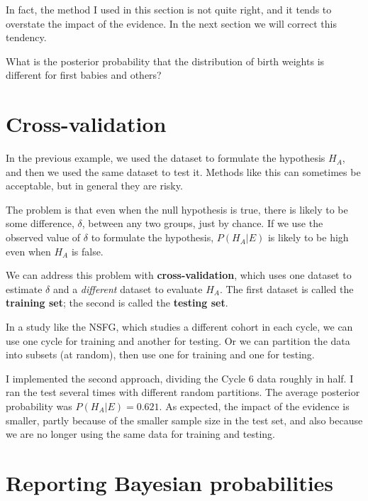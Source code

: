 \documentclass[12pt]{book}
\begin{document}
In fact, the method I used in this section is not quite right, and
it tends to overstate the impact of the evidence.  In the next section
we will correct this tendency.

\begin{ex}

What is the posterior probability that the distribution of birth
weights is different for first babies and others?

\end{ex}


\section{Cross-validation}

In the previous example, we used the dataset to formulate the
hypothesis $H_A$, and then we used the same dataset to test it.
Methods like this can sometimes be acceptable, but in general
they are risky.

The problem is that even when the null hypothesis is true, there is
likely to be some difference, $\delta$, between any two groups, just
by chance.  If we use the observed value of $\delta$ to formulate
the hypothesis, $P(H_A | E)$ is likely to be high even when $H_A$ is
false.

We can address this problem with {\bf cross-validation}, which uses
one dataset to estimate $\delta$ and a {\em different} dataset to
evaluate $H_A$.  The first dataset is called the {\bf training set};
the second is called the {\bf testing set}.

In a study like the NSFG, which studies a different cohort in each
cycle, we can use one cycle for training and another for testing.
Or we can partition the data into subsets (at random), then use
one for training and one for testing.

I implemented the second approach, dividing the Cycle 6 data roughly
in half.  I ran the test several times with different random partitions.
The average posterior probability was $P(H_A | E) = 0.621$.  As
expected, the impact of the evidence is smaller, partly because of
the smaller sample size in the test set, and also because we are
no longer using the same data for training and testing.



\section{Reporting Bayesian probabilities}
\end{document}
